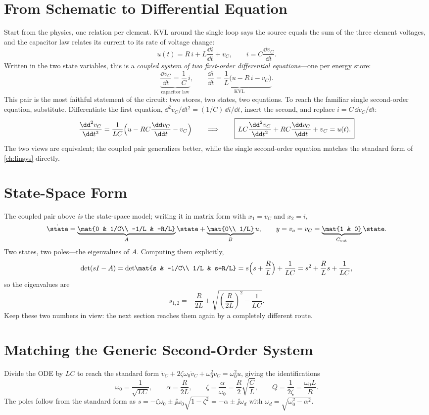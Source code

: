 \section{From Schematic to Differential Equation}
Start from the physics, one relation per element. KVL around the single loop says
the source equals the sum of the three element voltages, and the capacitor law
relates its current to its rate of voltage change:
\[
u(t)=R\,i+L\frac{\dd i}{\dd t}+v_C,
\qquad
i=C\frac{\dd v_C}{\dd t}.
\]
Written in the two state variables, this is a \emph{coupled system of two
first-order differential equations}---one per energy store:
\[
\underbrace{\frac{\dd v_C}{\dd t}=\frac{1}{C}\,i}_{\text{capacitor law}},
\qquad
\underbrace{\frac{\dd i}{\dd t}=\frac{1}{L}\bigl(u-R\,i-v_C\bigr)}_{\text{KVL}} .
\]
This pair is the most faithful statement of the circuit: two stores, two states,
two equations. To reach the familiar single second-order equation, substitute.
Differentiate the first equation, \(\dd^2v_C/\dd t^2=(1/C)\,\dd i/\dd t\), insert
the second, and replace \(i=C\,\dd v_C/\dd t\):
\[
\frac{\dd^2 v_C}{\dd t^2}
=\frac{1}{LC}\Bigl(u-RC\frac{\dd v_C}{\dd t}-v_C\Bigr)
\qquad\Longrightarrow\qquad
\boxed{\,LC\frac{\dd^2 v_C}{\dd t^2}+RC\frac{\dd v_C}{\dd t}+v_C=u(t).\,}
\]
The two views are equivalent; the coupled pair generalizes better, while the single
second-order equation matches the standard form of \cref{ch:linsys} directly.

\section{State-Space Form}
The coupled pair above \emph{is} the state-space model; writing it in matrix form
with \(x_1=v_C\) and \(x_2=i\),
\[
\dot{\state}=
\underbrace{\mat{0 & 1/C\\ -1/L & -R/L}}_{A}\state
+\underbrace{\mat{0\\ 1/L}}_{B}u,
\qquad
y=v_o=v_C=\underbrace{\mat{1 & 0}}_{C_{\text{out}}}\state .
\]
Two states, two poles---the eigenvalues of \(A\). Computing them explicitly,
\[
\det(sI-A)
=\det\!\mat{s & -1/C\\ 1/L & s+R/L}
=s\Bigl(s+\frac{R}{L}\Bigr)+\frac{1}{LC}
=s^2+\frac{R}{L}s+\frac{1}{LC},
\]
so the eigenvalues are
\[
s_{1,2}=-\frac{R}{2L}\pm\sqrt{\left(\frac{R}{2L}\right)^{\!2}-\frac{1}{LC}} .
\]
Keep these two numbers in view: the next section reaches them again by a completely
different route.

\section{Matching the Generic Second-Order System}
Divide the ODE by \(LC\) to reach the standard form
\(\ddot v_C+2\zeta\omega_0\dot v_C+\omega_0^2 v_C=\omega_0^2 u\), giving the
identifications
\[
\omega_0=\frac{1}{\sqrt{LC}},
\qquad
\alpha=\frac{R}{2L},
\qquad
\zeta=\frac{\alpha}{\omega_0}=\frac{R}{2}\sqrt{\frac{C}{L}},
\qquad
Q=\frac{1}{2\zeta}=\frac{\omega_0 L}{R}.
\]
The poles follow from the standard form as
\(s=-\zeta\omega_0\pm\jj\omega_0\sqrt{1-\zeta^2}=-\alpha\pm\jj\omega_d\) with
\(\omega_d=\sqrt{\omega_0^2-\alpha^2}\).

